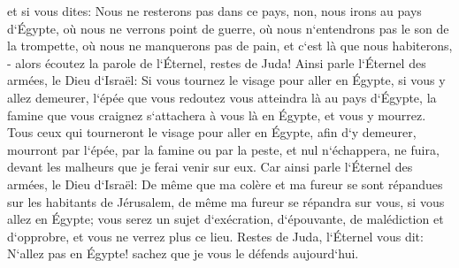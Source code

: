 \verse et si vous dites: Nous ne resterons pas dans ce pays, non, nous irons au pays d`Égypte, où nous ne verrons point de guerre, où nous n`entendrons pas le son de la trompette, où nous ne manquerons pas de pain, et c`est là que nous habiterons, - 
\verse alors écoutez la parole de l`Éternel, restes de Juda! Ainsi parle l`Éternel des armées, le Dieu d`Israël: Si vous tournez le visage pour aller en Égypte, si vous y allez demeurer, 
\verse l`épée que vous redoutez vous atteindra là au pays d`Égypte, la famine que vous craignez s`attachera à vous là en Égypte, et vous y mourrez. 
\verse Tous ceux qui tourneront le visage pour aller en Égypte, afin d`y demeurer, mourront par l`épée, par la famine ou par la peste, et nul n`échappera, ne fuira, devant les malheurs que je ferai venir sur eux. 
\verse Car ainsi parle l`Éternel des armées, le Dieu d`Israël: De même que ma colère et ma fureur se sont répandues sur les habitants de Jérusalem, de même ma fureur se répandra sur vous, si vous allez en Égypte; vous serez un sujet d`exécration, d`épouvante, de malédiction et d`opprobre, et vous ne verrez plus ce lieu. 
\verse Restes de Juda, l`Éternel vous dit: N`allez pas en Égypte! sachez que je vous le défends aujourd`hui. 
